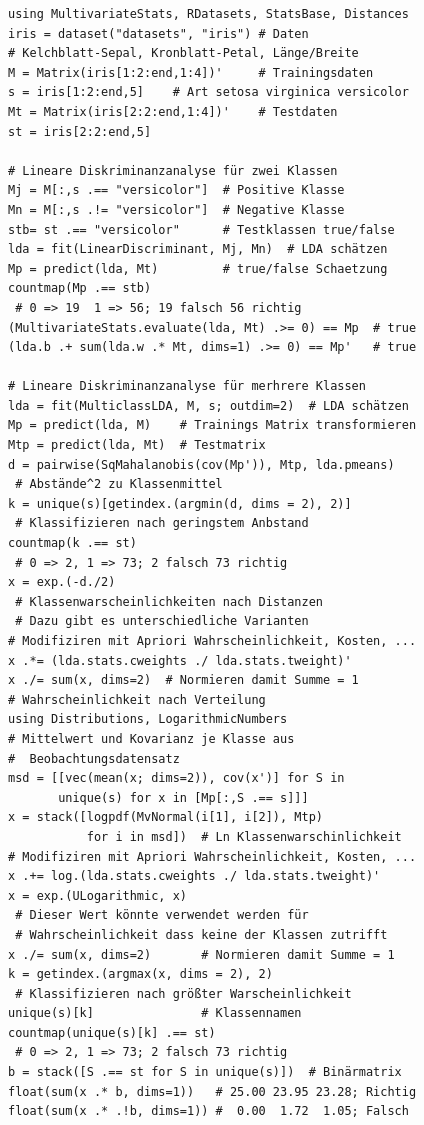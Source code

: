 \documentclass[10pt,twocolumn]{scrartcl}
\begin{document}
\begin{lstlisting}
using MultivariateStats, RDatasets, StatsBase, Distances
iris = dataset("datasets", "iris") # Daten
# Kelchblatt-Sepal, Kronblatt-Petal, Länge/Breite
M = Matrix(iris[1:2:end,1:4])'     # Trainingsdaten
s = iris[1:2:end,5]    # Art setosa virginica versicolor
Mt = Matrix(iris[2:2:end,1:4])'    # Testdaten
st = iris[2:2:end,5]

# Lineare Diskriminanzanalyse für zwei Klassen
Mj = M[:,s .== "versicolor"]  # Positive Klasse
Mn = M[:,s .!= "versicolor"]  # Negative Klasse
stb= st .== "versicolor"      # Testklassen true/false
lda = fit(LinearDiscriminant, Mj, Mn)  # LDA schätzen
Mp = predict(lda, Mt)         # true/false Schaetzung
countmap(Mp .== stb)
 # 0 => 19  1 => 56; 19 falsch 56 richtig
(MultivariateStats.evaluate(lda, Mt) .>= 0) == Mp  # true
(lda.b .+ sum(lda.w .* Mt, dims=1) .>= 0) == Mp'   # true

# Lineare Diskriminanzanalyse für merhrere Klassen
lda = fit(MulticlassLDA, M, s; outdim=2)  # LDA schätzen
Mp = predict(lda, M)    # Trainings Matrix transformieren
Mtp = predict(lda, Mt)  # Testmatrix
d = pairwise(SqMahalanobis(cov(Mp')), Mtp, lda.pmeans)
 # Abstände^2 zu Klassenmittel
k = unique(s)[getindex.(argmin(d, dims = 2), 2)]
 # Klassifizieren nach geringstem Anbstand
countmap(k .== st)
 # 0 => 2, 1 => 73; 2 falsch 73 richtig
x = exp.(-d./2)
 # Klassenwarscheinlichkeiten nach Distanzen
 # Dazu gibt es unterschiedliche Varianten
# Modifiziren mit Apriori Wahrscheinlichkeit, Kosten, ...
x .*= (lda.stats.cweights ./ lda.stats.tweight)'
x ./= sum(x, dims=2)  # Normieren damit Summe = 1
# Wahrscheinlichkeit nach Verteilung
using Distributions, LogarithmicNumbers
# Mittelwert und Kovarianz je Klasse aus
#  Beobachtungsdatensatz
msd = [[vec(mean(x; dims=2)), cov(x')] for S in
       unique(s) for x in [Mp[:,S .== s]]]
x = stack([logpdf(MvNormal(i[1], i[2]), Mtp)
           for i in msd])  # Ln Klassenwarschinlichkeit
# Modifiziren mit Apriori Wahrscheinlichkeit, Kosten, ...
x .+= log.(lda.stats.cweights ./ lda.stats.tweight)'
x = exp.(ULogarithmic, x)
 # Dieser Wert könnte verwendet werden für
 # Wahrscheinlichkeit dass keine der Klassen zutrifft
x ./= sum(x, dims=2)       # Normieren damit Summe = 1
k = getindex.(argmax(x, dims = 2), 2)
 # Klassifizieren nach größter Warscheinlichkeit
unique(s)[k]               # Klassennamen
countmap(unique(s)[k] .== st)
 # 0 => 2, 1 => 73; 2 falsch 73 richtig
b = stack([S .== st for S in unique(s)])  # Binärmatrix
float(sum(x .* b, dims=1))   # 25.00 23.95 23.28; Richtig
float(sum(x .* .!b, dims=1)) #  0.00  1.72  1.05; Falsch


\end{lstlisting}
\end{document}
